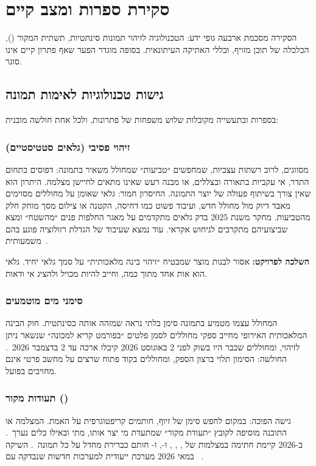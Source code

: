 \chapter{סקירת ספרות ומצב קיים}\label{ch:lit}

הסקירה מסכמת ארבעה גופי ידע: הטכנולוגיה לזיהוי תמונות סינתטיות, תשתית המקור (), הכלכלה של תוכן מזויף, וכללי האתיקה העיתונאית. בסופה מוגדר הפער שאף פתרון קיים אינו סוגר.

\section{גישות טכנולוגיות לאימות תמונה}
בספרות ובתעשייה מקובלות שלוש משפחות של פתרונות, ולכל אחת חולשה מובנית:

\subsection{זיהוי פסיבי (גלאים סטטיסטיים)}
מסווגים, לרוב רשתות עצביות, שמחפשים ״טביעות״ שמחולל משאיר בתמונה: דפוסים בתחום התדר, אי עקביות בתאורה ובצללים, או מבנה רעש שאינו מתאים לחיישן מצלמה. היתרון הוא שאין צורך בשיתוף פעולה של יוצר התמונה. החיסרון חמור: גלאי שאומן על מחוללים מסוימים מאבד דיוק מול מחולל חדש, ועיבוד פשוט כמו דחיסה, הקטנה או צילום מסך מוחק חלק מהטביעות. מחקר משנת \num{2025} בדק גלאים מתקדמים על מאגר החלפות פנים ״מהשטח״ ומצא שביצועיהם מתקרבים לניחוש אקראי. עוד נמצא שעיבוד של הגדלת רזולוציה פוגע בהם משמעותית~\cite{ren2025}.

\textbf{השלכה לפרויקט:} אסור לבנות מוצר שמבטיח ״זיהוי בינה מלאכותית״ על סמך גלאי יחיד. גלאי הוא אות אחד מתוך כמה, וחייב להיות מכויל ולהציג אי ודאות.

\subsection{סימני מים מוטמעים}
המחולל עצמו מטמיע בתמונה סימן בלתי נראה שמזהה אותה כסינתטית. חוק הבינה המלאכותית האירופי מחייב ספקי מחוללים לסמן פלטים ״בפורמט קריא למכונה״ שנשאר ניתן לזיהוי, ומחוללים שכבר היו בשוק לפני \num{2} באוגוסט \num{2026} קיבלו ארכה עד \num{2} בדצמבר \num{2026}~\cite{euaiact2026}. החולשה: הסימון תלוי ברצון הספק, ומחוללים בקוד פתוח שרצים על מחשב פרטי אינם מחויבים בפועל.

\subsection{תעודות מקור ()}
גישה הפוכה: במקום לחפש סימן של זיוף, חותמים קריפטוגרפית על האמת. המצלמה או התוכנה מוסיפה לקובץ ״תעודת מקור״ שמתעדת מי יצר אותו, מתי ובאילו כלים נערך~\cite{c2paspec}. ב-\num{2026} קיימת חתימה במצלמות של , , ,  ו-, ו- חותם כברירת מחדל על כל תמונה~\cite{c2pa2026}.  השיקה במאי \num{2026} מערכת ייעודית למערכות חדשות שנבדקה עם ~\cite{canon2026}.

